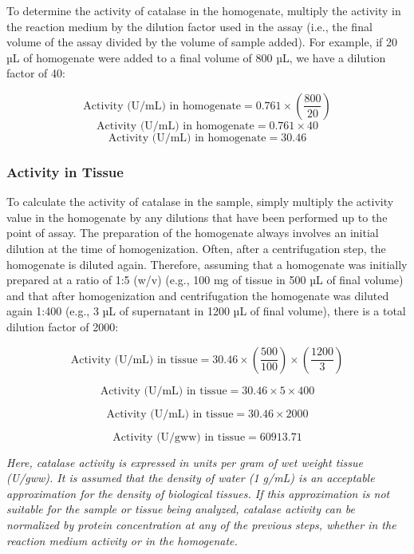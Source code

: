 \documentclass[
  9pt,
  american,
  a5paper,
  extrafontsizes,onecolumn,openright
  ]{memoir}
\newlength{\rf}
\begin{document}
To determine the activity of catalase in the homogenate, multiply the activity in the reaction medium by the dilution factor used in the assay (i.e., the final volume of the assay divided by the volume of sample added). For example, if 20 µL of homogenate were added to a final volume of 800 µL, we have a dilution factor of 40:

\[ \text{Activity (U/mL) in homogenate} = 0.761 \times \left( \frac{800}{20} \right)\]
\[ \text{Activity (U/mL) in homogenate} = 0.761 \times 40\]
\[ \text{Activity (U/mL) in homogenate} = 30.46 \]

\subsubsection{Activity in Tissue}\label{activity-in-tissue}

To calculate the activity of catalase in the sample, simply multiply the activity value in the homogenate by any dilutions that have been performed up to the point of assay. The preparation of the homogenate always involves an initial dilution at the time of homogenization. Often, after a centrifugation step, the homogenate is diluted again. Therefore, assuming that a homogenate was initially prepared at a ratio of 1:5 (w/v) (e.g., 100 mg of tissue in 500 µL of final volume) and that after homogenization and centrifugation the homogenate was diluted again 1:400 (e.g., 3 µL of supernatant in 1200 µL of final volume), there is a total dilution factor of 2000:

\[ \text{Activity (U/mL) in tissue} = 30.46 \times \left( \frac{500}{100} \right) \times \left( \frac{1200}{3} \right)\]

\[ \text{Activity (U/mL) in tissue} = 30.46 \times 5 \times 400\]

\[ \text{Activity (U/mL) in tissue} = 30.46 \times 2000\]

\[ \text{Activity (U/gww) in tissue} = 60913.71\]

\begin{greybox}[frametitle = Note]
\emph{Here, catalase activity is expressed in units per gram of wet weight tissue (U/gww). It is assumed that the density of water (1 g/mL) is an acceptable approximation for the density of biological tissues. If this approximation is not suitable for the sample or tissue being analyzed, catalase activity can be normalized by protein concentration at any of the previous steps, whether in the reaction medium activity or in the homogenate.}

\end{greybox}
\end{document}
